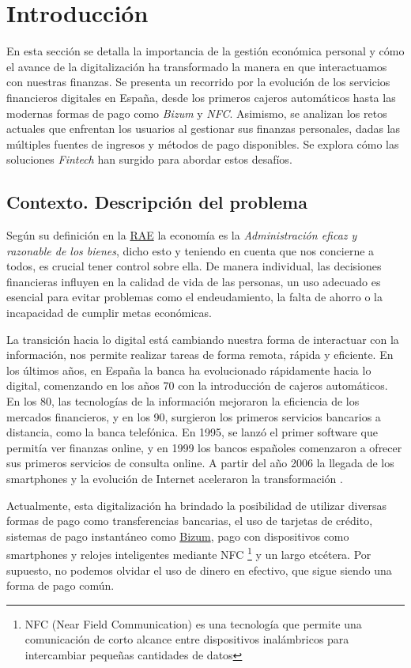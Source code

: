 \chapter{Introducción}
En esta sección se detalla la importancia de la gestión económica personal y cómo el avance de la digitalización ha transformado la manera en que interactuamos con nuestras finanzas. Se presenta un recorrido por la evolución de los servicios financieros digitales en España, desde los primeros cajeros automáticos hasta las modernas formas de pago como \textit{Bizum} y \textit{NFC}. Asimismo, se analizan los retos actuales que enfrentan los usuarios al gestionar sus finanzas personales, dadas las múltiples fuentes de ingresos y métodos de pago disponibles. Se explora cómo las soluciones \textit{Fintech} han surgido para abordar estos desafíos.

\section{Contexto. Descripción del problema} 
Según su definición en la \href{https://dle.rae.es/economía}{RAE} la economía es la 
\textit{Administración eficaz y razonable de los bienes}, dicho esto y teniendo en 
cuenta que nos concierne a todos, es crucial tener control sobre ella. 
De manera individual, las decisiones financieras influyen en la calidad de vida de las personas,
un uso adecuado es esencial para evitar problemas como el endeudamiento, la 
falta de ahorro o la incapacidad de cumplir metas económicas.

La transición hacia lo digital está cambiando nuestra forma de interactuar con la información, nos permite realizar tareas de forma remota, rápida y eficiente. 
En los últimos años, en España la banca ha evolucionado rápidamente hacia lo digital, comenzando en los años 70 con la introducción de cajeros automáticos. En los 80, las tecnologías de la información mejoraron la eficiencia de los mercados financieros, y en los 90, surgieron los primeros servicios bancarios a distancia, como la banca telefónica. En 1995, se lanzó el primer software que permitía ver finanzas online, y en 1999 los bancos españoles comenzaron a ofrecer sus primeros servicios de consulta online. A partir del año 2006 la llegada de los smartphones y la evolución de Internet aceleraron la transformación \cite{hebrero2022fintech}.

Actualmente, esta digitalización ha brindado la posibilidad de utilizar diversas formas de pago como transferencias bancarias, el uso de tarjetas de crédito, sistemas de pago instantáneo como \href{https://bizum.es/}{Bizum}, pago con dispositivos como smartphones y relojes inteligentes mediante NFC \footnote{NFC (Near Field Communication) es una tecnología que permite una comunicación de corto alcance entre dispositivos inalámbricos para intercambiar pequeñas cantidades de datos} y un largo etcétera. Por supuesto, no podemos olvidar el uso de dinero en efectivo, que sigue siendo una forma de pago común. 

